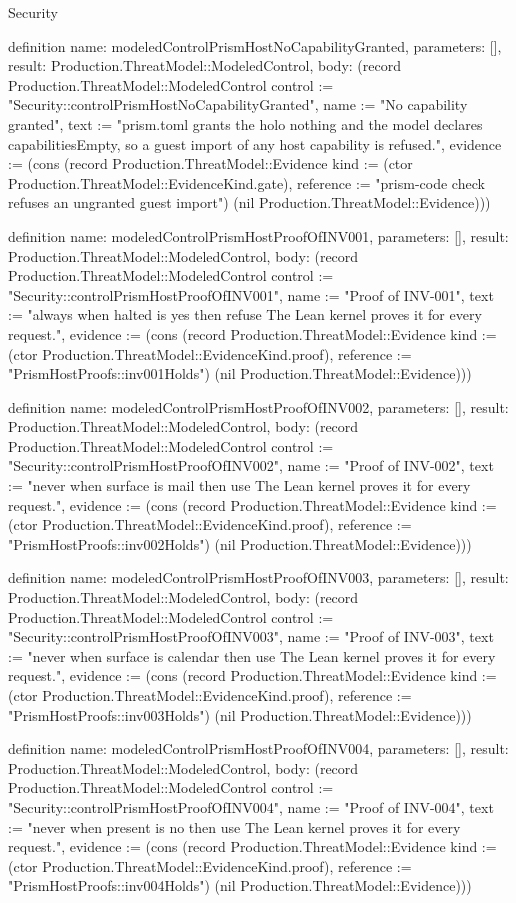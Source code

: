 \begin{lexlean}{Security}
\begin{semanticmodule}
definition{
  name: modeledControlPrismHostNoCapabilityGranted,
  parameters: [],
  result: Production.ThreatModel::ModeledControl,
  body: (record Production.ThreatModel::ModeledControl {control := "Security::controlPrismHostNoCapabilityGranted", name := "No capability granted", text := "prism.toml grants the holo nothing and the model declares capabilitiesEmpty, so a guest import of any host capability is refused.", evidence := (cons (record Production.ThreatModel::Evidence {kind := (ctor Production.ThreatModel::EvidenceKind.gate), reference := "prism-code check refuses an ungranted guest import"}) (nil Production.ThreatModel::Evidence))})
}

definition{
  name: modeledControlPrismHostProofOfINV001,
  parameters: [],
  result: Production.ThreatModel::ModeledControl,
  body: (record Production.ThreatModel::ModeledControl {control := "Security::controlPrismHostProofOfINV001", name := "Proof of INV-001", text := "always when halted is yes then refuse The Lean kernel proves it for every request.", evidence := (cons (record Production.ThreatModel::Evidence {kind := (ctor Production.ThreatModel::EvidenceKind.proof), reference := "PrismHostProofs::inv001Holds"}) (nil Production.ThreatModel::Evidence))})
}

definition{
  name: modeledControlPrismHostProofOfINV002,
  parameters: [],
  result: Production.ThreatModel::ModeledControl,
  body: (record Production.ThreatModel::ModeledControl {control := "Security::controlPrismHostProofOfINV002", name := "Proof of INV-002", text := "never when surface is mail then use The Lean kernel proves it for every request.", evidence := (cons (record Production.ThreatModel::Evidence {kind := (ctor Production.ThreatModel::EvidenceKind.proof), reference := "PrismHostProofs::inv002Holds"}) (nil Production.ThreatModel::Evidence))})
}

definition{
  name: modeledControlPrismHostProofOfINV003,
  parameters: [],
  result: Production.ThreatModel::ModeledControl,
  body: (record Production.ThreatModel::ModeledControl {control := "Security::controlPrismHostProofOfINV003", name := "Proof of INV-003", text := "never when surface is calendar then use The Lean kernel proves it for every request.", evidence := (cons (record Production.ThreatModel::Evidence {kind := (ctor Production.ThreatModel::EvidenceKind.proof), reference := "PrismHostProofs::inv003Holds"}) (nil Production.ThreatModel::Evidence))})
}

definition{
  name: modeledControlPrismHostProofOfINV004,
  parameters: [],
  result: Production.ThreatModel::ModeledControl,
  body: (record Production.ThreatModel::ModeledControl {control := "Security::controlPrismHostProofOfINV004", name := "Proof of INV-004", text := "never when present is no then use The Lean kernel proves it for every request.", evidence := (cons (record Production.ThreatModel::Evidence {kind := (ctor Production.ThreatModel::EvidenceKind.proof), reference := "PrismHostProofs::inv004Holds"}) (nil Production.ThreatModel::Evidence))})
}


\end{semanticmodule}
\end{lexlean}
